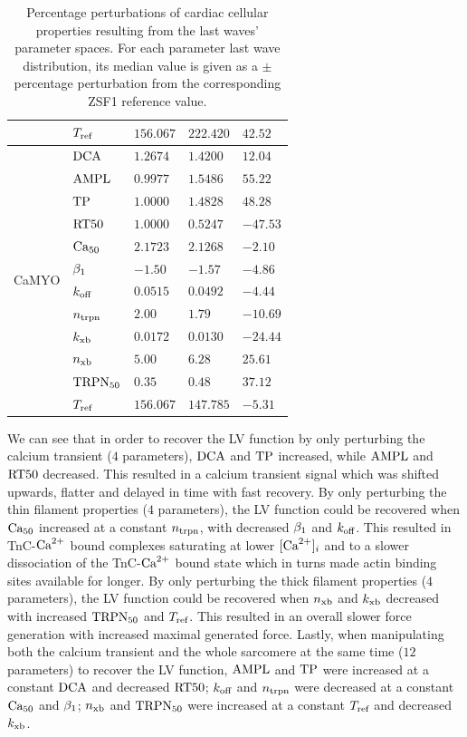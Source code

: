 \begin{table}[!ht]
\begin{tabularx}{\textwidth}{lXXXX}
    & $T_{\textrm{ref}}$ & $156.067$ & $222.420$ & $42.52$ \\
    \midrule
    \multirow{12}{*}{CaMYO} & $\textrm{DCA}$ & $1.2674$ & $1.4200$ & $12.04$ \\
    & $\textrm{AMPL}$ & $0.9977$ & $1.5486$ & $55.22$ \\
    & $\textrm{TP}$ & $1.0000$ & $1.4828$ & $48.28$ \\
    & $\textrm{RT50}$ & $1.0000$ & $0.5247$ & $-47.53$ \\
    & $\textrm{Ca}_{50}$ & $2.1723$ & $2.1268$ & $-2.10$ \\
    & $\beta_1$ & $-1.50$ & $-1.57$ & $-4.86$ \\
    & $k_{\textrm{off}}$ & $0.0515$ & $0.0492$ & $-4.44$ \\
    & $n_{\textrm{trpn}}$ & $2.00$ & $1.79$ & $-10.69$ \\
    & $k_{\textrm{xb}}$ & $0.0172$ & $0.0130$ & $-24.44$ \\
    & $n_{\textrm{xb}}$ & $5.00$ & $6.28$ & $25.61$ \\
    & $\textrm{TRPN}_{50}$ & $0.35$ & $0.48$ & $37.12$ \\
    & $T_{\textrm{ref}}$ & $156.067$ & $147.785$ & $-5.31$ \\
    \bottomrule
    \end{tabularx}
    \caption{Percentage perturbations of cardiac cellular properties resulting from the last waves' parameter spaces. For each parameter last wave distribution, its median value is given as a $\pm$ percentage perturbation from the corresponding ZSF1 reference value.}
    \label{tab:virtualdrugeffects}
\end{table}

\vspace{0.2cm}
We can see that in order to recover the LV function by only perturbing the calcium transient ($4$ parameters), $\textrm{DCA}$ and $\textrm{TP}$ increased, while $\textrm{AMPL}$ and $\textrm{RT50}$ decreased. This resulted in a calcium transient signal which was shifted upwards, flatter and delayed in time with fast recovery. By only perturbing the thin filament properties ($4$ parameters), the LV function could be recovered when $\textrm{Ca}_{50}$ increased at a constant $n_{\textrm{trpn}}$, with decreased $\beta_1$ and $k_{\textrm{off}}$. This resulted in TnC-$\textrm{Ca}^{2+}$ bound complexes saturating at lower $[\textrm{Ca}^{2+}]_{i}$ and to a slower dissociation of the TnC-$\textrm{Ca}^{2+}$ bound state which in turns made actin binding sites available for longer. By only perturbing the thick filament properties ($4$ parameters), the LV function could be recovered when $n_{\textrm{xb}}$ and $k_{\textrm{xb}}$ decreased with increased $\textrm{TRPN}_{50}$ and $T_{\textrm{ref}}$. This resulted in an overall slower force generation with increased maximal generated force. Lastly, when manipulating both the calcium transient and the whole sarcomere at the same time ($12$ parameters) to recover the LV function, $\textrm{AMPL}$ and $\textrm{TP}$ were increased at a constant $\textrm{DCA}$ and decreased $\textrm{RT50}$; $k_{\textrm{off}}$ and $n_{\textrm{trpn}}$ were decreased at a constant $\textrm{Ca}_{50}$ and $\beta_1$; $n_{\textrm{xb}}$ and $\textrm{TRPN}_{50}$ were increased at a constant $T_{\textrm{ref}}$ and decreased $k_{\textrm{xb}}$.

